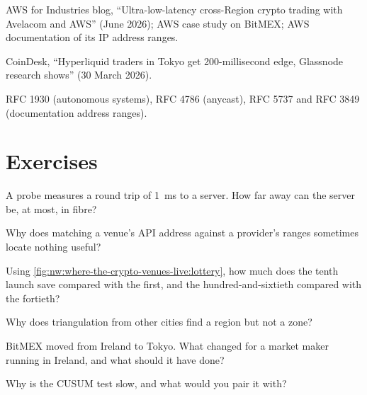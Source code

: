 \begin{omsources}
\item AWS for Industries blog, ``Ultra-low-latency cross-Region crypto trading with Avelacom and AWS'' (June 2026); AWS case study on BitMEX; AWS
documentation of its IP address ranges.
\item CoinDesk, ``Hyperliquid traders in Tokyo get 200-millisecond edge, Glassnode research shows'' (30 March 2026).
\item RFC 1930 (autonomous systems), RFC 4786 (anycast), RFC 5737 and RFC 3849 (documentation address ranges).
\end{omsources}

\section{Exercises}

\begin{exercise}[$\star$]\label{exo:nw:where-the-crypto-venues-live:1}
A probe measures a round trip of \qty{1}{\milli\second} to a server. How far away can the server be, at most, in fibre?
\end{exercise}

\begin{exercise}[$\star$]\label{exo:nw:where-the-crypto-venues-live:2}
Why does matching a venue's API address against a provider's ranges sometimes locate nothing useful?
\end{exercise}

\begin{exercise}[$\star$]\label{exo:nw:where-the-crypto-venues-live:3}
Using \cref{fig:nw:where-the-crypto-venues-live:lottery}, how much does the tenth launch save compared with the first, and the hundred-and-sixtieth
compared with the fortieth?
\end{exercise}

\begin{exercise}[$\star\star$]\label{exo:nw:where-the-crypto-venues-live:4}
Why does triangulation from other cities find a region but not a zone?
\end{exercise}

\begin{exercise}[$\star\star$]\label{exo:nw:where-the-crypto-venues-live:5}
BitMEX moved from Ireland to Tokyo. What changed for a market maker running in Ireland, and what should it have done?
\end{exercise}

\begin{exercise}[$\star\star$]\label{exo:nw:where-the-crypto-venues-live:6}
Why is the CUSUM test slow, and what would you pair it with?
\end{exercise}

